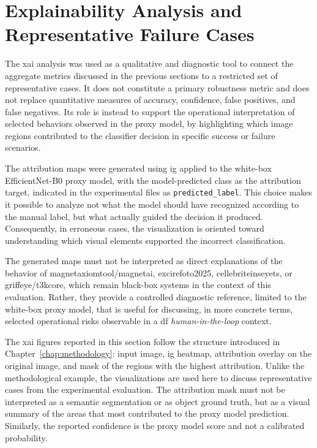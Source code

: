 \section{Explainability Analysis and Representative Failure Cases}
\label{sec:results-xai}

The \gls{xai} analysis was used as a qualitative and diagnostic tool to connect
the aggregate metrics discussed in the previous sections to a restricted set of
representative cases. It does not constitute a primary robustness metric and
does not replace quantitative measures of accuracy, confidence, false positives,
and false negatives. Its role is instead to support the operational
interpretation of selected behaviors observed in the proxy model, by
highlighting which image regions contributed to the classifier decision in
specific success or failure scenarios.

The attribution maps were generated using \gls{ig} applied to the white-box
EfficientNet-B0 proxy model, with the model-predicted class as the attribution
target, indicated in the experimental files as \texttt{predicted\_label}. This
choice makes it possible to analyze not what the model should have recognized
according to the manual label, but what actually guided the decision it
produced. Consequently, in erroneous cases, the visualization is oriented toward
understanding which visual elements supported the incorrect classification.

The generated maps must not be interpreted as direct explanations of the
behavior of \gls{magnetaxiomtool}/\gls{magnetai},
\gls{excirefoto2025}, \gls{cellebriteinseyets}, or
\gls{griffeye}/\gls{t3kcore}, which remain black-box systems in the context of
this evaluation. Rather, they provide a controlled diagnostic reference, limited
to the white-box proxy model, that is useful for discussing, in more concrete
terms, selected operational risks observable in a \gls{df}
\textit{human-in-the-loop} context.

The \gls{xai} figures reported in this section follow the structure introduced
in Chapter~\ref{chap:methodology}: input image, \gls{ig} heatmap, attribution
overlay on the original image, and mask of the regions with the highest
attribution. Unlike the methodological example, the visualizations are used here
to discuss representative cases from the experimental evaluation. The
attribution mask must not be interpreted as a semantic segmentation or as object
ground truth, but as a visual summary of the areas that most contributed to the
proxy model prediction. Similarly, the reported confidence is the proxy model
score and not a calibrated probability.

